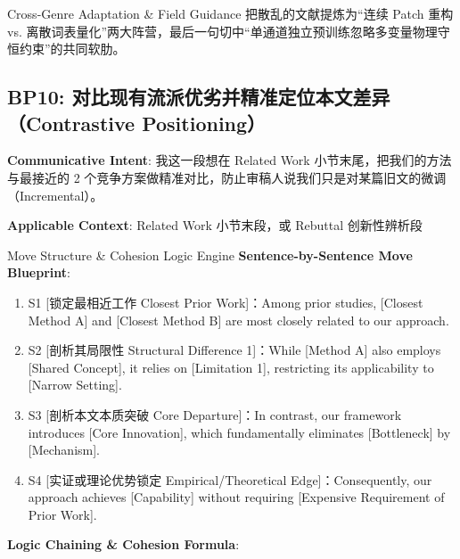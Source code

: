 \endgroup
\vspace{4pt}
\begin{TipBox}{Cross-Genre Adaptation \& Field Guidance}
把散乱的文献提炼为“连续 Patch 重构 vs. 离散词表量化”两大阵营，最后一句切中“单通道独立预训练忽略多变量物理守恒约束”的共同软肋。
\end{TipBox}
\vspace{8pt}
\subsection{BP10: 对比现有流派优劣并精准定位本文差异（Contrastive Positioning）}\label{sec:bp:BP10}
\noindent\textbf{\color{AcadNavy}Communicative Intent}: 我这一段想在 Related Work 小节末尾，把我们的方法与最接近的 2 个竞争方案做精准对比，防止审稿人说我们只是对某篇旧文的微调（Incremental）。\par\vspace{2pt}
\noindent\textbf{\color{AcadSlate}Applicable Context}: Related Work 小节末段，或 Rebuttal 创新性辨析段\par\vspace{4pt}
\begin{ConceptBox}{Move Structure \& Cohesion Logic Engine}
\textbf{Sentence-by-Sentence Move Blueprint}:
\begin{enumerate}[label=\textbf{\color{AcadNavy}S\arabic*.}, leftmargin=2em, itemsep=2pt]
  \item S1 [锁定最相近工作 Closest Prior Work]：Among prior studies, [Closest Method A] and [Closest Method B] are most closely related to our approach.
  \item S2 [剖析其局限性 Structural Difference 1]：While [Method A] also employs [Shared Concept], it relies on [Limitation 1], restricting its applicability to [Narrow Setting].
  \item S3 [剖析本文本质突破 Core Departure]：In contrast, our framework introduces [Core Innovation], which fundamentally eliminates [Bottleneck] by [Mechanism].
  \item S4 [实证或理论优势锁定 Empirical/Theoretical Edge]：Consequently, our approach achieves [Capability] without requiring [Expensive Requirement of Prior Work].
\end{enumerate}\par\vspace{4pt}
\textbf{Logic Chaining \& Cohesion Formula}:\par{}
\end{ConceptBox}

